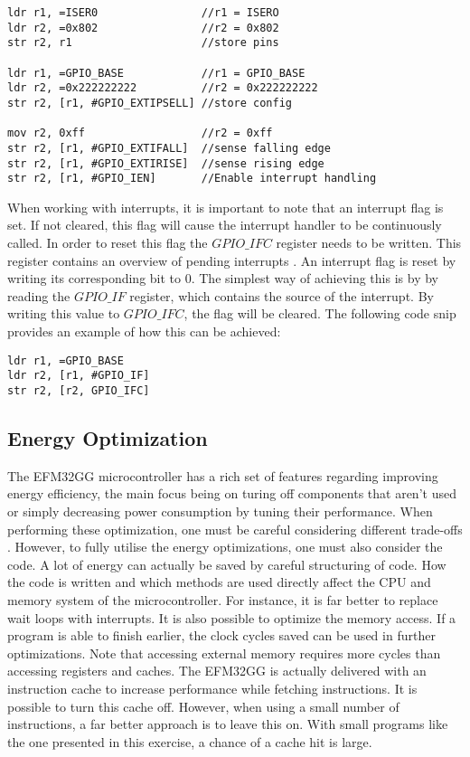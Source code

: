 \begin{lstlisting}
ldr r1, =ISER0                //r1 = ISERO
ldr r2, =0x802                //r2 = 0x802  
str r2, r1                    //store pins

ldr r1, =GPIO_BASE            //r1 = GPIO_BASE
ldr r2, =0x222222222          //r2 = 0x222222222
str r2, [r1, #GPIO_EXTIPSELL] //store config

mov r2, 0xff                  //r2 = 0xff 
str r2, [r1, #GPIO_EXTIFALL]  //sense falling edge
str r2, [r1, #GPIO_EXTIRISE]  //sense rising edge
str r2, [r1, #GPIO_IEN]       //Enable interrupt handling 

\end{lstlisting}

When working with interrupts, it is important to note that an interrupt flag is set. If not cleared, this flag will cause the interrupt handler to be continuously called. In order to reset this flag the $GPIO\_IFC$ register needs to be written. This register contains an overview of pending interrupts \cite[p. 763]{EFM32GG-rm}. An interrupt flag is reset by writing its corresponding bit to 0.  The simplest way of achieving this is by by reading the $GPIO\_IF$ register, which contains the source of the interrupt. By writing this value to $GPIO\_IFC$, the flag will be cleared. The following code snip provides an example of how this can be achieved:

\begin{lstlisting}
ldr r1, =GPIO_BASE
ldr r2, [r1, #GPIO_IF]
str r2, [r2, GPIO_IFC]
\end{lstlisting}
 

\subsection{Energy Optimization}\label{ch:energy_optimization} 
The EFM32GG microcontroller has a rich set of features regarding improving energy efficiency, the main focus being on turing off components that aren't used or simply decreasing power consumption by tuning their performance. When performing these optimization, one must be careful considering different trade-offs \cite{EFM32GG-energy}. However, to fully utilise the energy optimizations, one must also consider the code. A lot of energy can actually be saved by careful structuring of code. How the code is written and which methods are used directly affect the CPU and memory system of the microcontroller. For instance, it is far better to replace wait loops with interrupts. It is also possible to optimize the memory access. If a program is able to finish earlier, the clock cycles saved can be used in further optimizations. Note that accessing external memory requires more cycles than accessing registers and caches. The EFM32GG is actually delivered with an instruction cache to increase performance while fetching instructions. It is possible to turn this cache off. However, when using a small number of instructions, a far better approach is to leave this on. With small programs like the one presented in this exercise, a chance of a cache hit is large.

